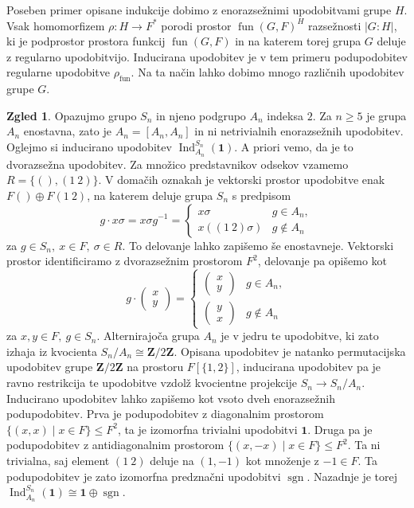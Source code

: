 \documentclass[11pt]{book}
\def\ZZ{\mathbf{Z}}
\def\oneone{\mathbf{1}}
\DeclareMathOperator\sgn{sgn}
\DeclareMathOperator\Ind{Ind}
\DeclareMathOperator\fun{fun}
\theoremstyle{definition}
\theoremstyle{zgled}
\newtheorem{zgled}[theorem]{Zgled}
\theoremstyle{zgledbrezstevilke}
\theoremstyle{odprtproblem}
\theoremstyle{domacanaloga}
\theoremstyle{izrek}
\begin{document}
Poseben primer opisane indukcije dobimo z enorazsežnimi upodobitvami grupe $H$. Vsak homomorfizem $\rho \colon H \to F^*$ porodi prostor $\fun(G,F)^H$ razsežnosti $|G:H|$, ki je podprostor prostora funkcij $\fun(G,F)$ in na katerem torej grupa $G$ deluje z regularno upodobitvijo. Inducirana upodobitev je v tem primeru podupodobitev regularne upodobitve $\rho_{\fun}$. Na ta način lahko dobimo mnogo različnih upodobitev grupe $G$.

\begin{zgled}
    Opazujmo grupo $S_n$ in njeno podgrupo $A_n$ indeksa $2$. Za $n \geq 5$ je grupa $A_n$ enostavna, zato je $A_n = [A_n, A_n]$ in ni netrivialnih enorazsežnih upodobitev. Oglejmo si inducirano upodobitev $\Ind^{S_n}_{A_n}(\oneone)$. A priori vemo, da je to dvorazsežna upodobitev. Za množico predstavnikov odsekov vzamemo $R = \{ (), (1 \ 2) \}$. V domačih oznakah je vektorski prostor upodobitve enak $F ()\oplus F (1 \ 2)$, na katerem deluje grupa $S_n$ s predpisom
    \[
        g \cdot x \sigma = x \sigma g^{-1} = \begin{cases}
            x \sigma   & g \in A_n, \\
            x \left((1 \ 2)\sigma\right)    & g \notin A_n
        \end{cases}
    \]
    za $g \in S_n, \ x \in F, \ \sigma \in R$. To delovanje lahko zapišemo še enostavneje. Vektorski prostor identificiramo z dvorazsežnim prostorom $F^2$, delovanje pa opišemo kot
    \[
        g \cdot \begin{pmatrix}
            x \\ y
        \end{pmatrix} =
        \begin{cases}
            \begin{pmatrix}
                x \\ y
            \end{pmatrix} & g \in A_n, \\
            \begin{pmatrix}
                y \\ x
            \end{pmatrix} & g \notin A_n
        \end{cases}
    \]
    za $x,y \in F, \ g \in S_n$. Alternirajoča grupa $A_n$ je v jedru te upodobitve, ki zato izhaja iz kvocienta $S_n/A_n \cong \ZZ/2\ZZ$. Opisana upodobitev je natanko permutacijska upodobitev grupe $\ZZ/2\ZZ$ na prostoru $F[\{ 1, 2 \}]$, inducirana upodobitev pa je ravno restrikcija te upodobitve vzdolž kvocientne projekcije $S_n \to S_n/A_n$. Inducirano upodobitev lahko zapišemo kot vsoto dveh enorazsežnih podupodobitev. Prva je podupodobitev z diagonalnim prostorom $\{ (x,x) \mid x \in F \} \leq F^2$, ta je izomorfna trivialni upodobitvi $\oneone$. Druga pa je podupodobitev z antidiagonalnim prostorom $\{ (x, -x) \mid x \in F \} \leq F^2$. Ta ni trivialna, saj element $(1 \ 2)$ deluje na $(1, -1)$ kot množenje z $-1 \in F$. Ta podupodobitev je zato izomorfna predznačni upodobitvi $\sgn$. Nazadnje je torej $\Ind^{S_n}_{A_n}(\oneone) \cong \oneone \oplus \sgn$.
\end{zgled}
\end{document}
